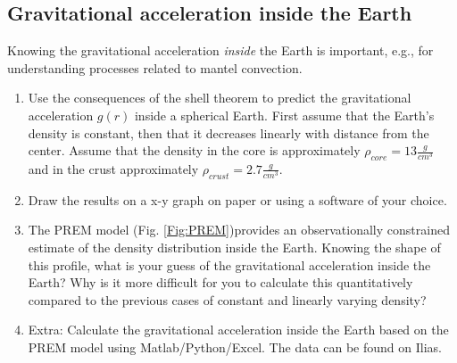 \subsection{Gravitational acceleration inside the Earth}
Knowing the gravitational acceleration \textit{inside} the Earth is important, e.g., for understanding processes related to mantel convection.
\begin{enumerate}[label=(\alph*)]
  \item Use the consequences of the shell theorem to predict the gravitational acceleration $g(r)$ inside a spherical Earth. First assume that the Earth's density is constant, then that it decreases linearly with distance from the center. Assume that the density in the core is approximately $\rho_{core} = 13 \frac{g}{cm^3}$ and in the crust approximately $\rho_{crust} = 2.7 \frac{g}{cm^3}$.

  \item Draw the results on a x-y graph on paper or using a software of your choice.

  \item The PREM model (Fig. \ref{Fig:PREM})provides an observationally constrained estimate of the density distribution inside the Earth. Knowing the shape of this profile, what is your guess of the gravitational acceleration inside the Earth? Why is it more difficult for you to calculate this quantitatively compared to the previous cases of constant and linearly varying density?

  \item Extra: Calculate the gravitational acceleration inside the Earth based on the PREM model using Matlab/Python/Excel. The data can be found on Ilias.
\end{enumerate}

